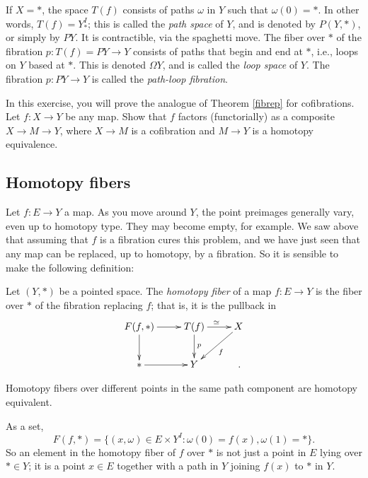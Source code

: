 \begin{example}
        If $X = \ast$, the space $T(f)$ consists of paths $\omega$ in $Y$ such that $\omega(0) = \ast$.
    In other words, $T(f) = Y^I_\ast$; this is called the \emph{path space} of $Y$, and is denoted by $P(Y,\ast)$, or simply by $PY$. It is
contractible, via the spaghetti move. 
    The fiber over $\ast$ of the fibration $p:T(f) = PY \to Y$ consists of paths that begin and end at $\ast$, i.e., 
    loops on $Y$ based at $\ast$.
    This is denoted $\Omega Y$, and is called the \emph{loop space} of $Y$.
    The fibration $p:PY \to Y$ is called the \emph{path-loop fibration}.
\end{example}

\begin{exercise}\label{cofibrep}
    In this exercise, you will prove the analogue of Theorem \ref{fibrep} for cofibrations.
    Let $f:X\to Y$ be any map.
    Show that $f$ factors (functorially) as a composite $X \to M \to Y$, where $X\to M$ is a cofibration and $M\to Y$ is a homotopy
    equivalence.
\end{exercise}

\subsection{Homotopy fibers}
Let $f:E\to Y$ a map. As you move around $Y$, the point preimages
generally vary, even up to homotopy type. They may become empty,
for example. We saw above that assuming that $f$ is a fibration
cures this problem,
and we have just seen that any map can be replaced, up to homotopy,
by a fibration. So it is sensible to make the following definition:
\begin{definition}
Let $(Y,*)$ be a pointed space. 
The \emph{homotopy fiber} of a map $f:E\to Y$ is the fiber over $*$ of
the fibration replacing $f$; that is, it is the pullback in
    \begin{equation*}
	\xymatrix{
	    F(f,\ast)\ar[r]\ar[d] & T(f)\ar[r]^\simeq \ar[d]^p & X\ar[dl]^f\\
	    \ast \ar[r] & Y & \,.
	    }
    \end{equation*}
\end{definition}
Homotopy fibers over different points in the same path component are homotopy
equivalent. 

As a set, 
\begin{equation}
\label{sethomotopyfiber}
F(f,\ast) = \{(x,\omega)\in E\times Y^I: \omega(0)=f(x), \omega(1) = \ast\}.
\end{equation}
So an element in the homotopy fiber of $f$ over $*$ is not just a
point in $E$ lying over $*\in Y$; it is a point $x\in E$ together with a path 
in $Y$ joining $f(x)$ to $\ast$ in $Y$. 

